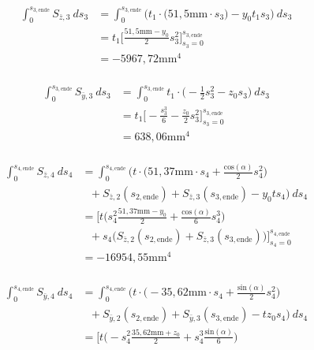 \begin{itemize}
\begin{equation}
\begin{split}
			\int_{0}^{s_{3,\mathrm{ende}}} S_{\bar z,3}\ ds_3 &= \int_{0}^{s_{3,\mathrm{ende}}} \bigg(t_1\cdot\bigg(51,5\mathrm{mm}\cdot s_3\bigg) -y_0t_1s_3\bigg)\ ds_3\\\
			&=t_1\bigg[\frac{51,5\mathrm{mm}-y_0}{2}s_3^2\bigg]_{s_3=0}^{s_{3,\mathrm{ende}}}\\\
			&=-5967,72\mathrm{mm}^4
		\end{split}
	\end{equation}\\
	\begin{equation}
		\begin{split}
			\int_{0}^{s_{3,\mathrm{ende}}} S_{\bar y,3}\ ds_3 &= \int_{0}^{s_{3,\mathrm{ende}}} t_1\cdot\bigg(-\frac{1}{2}s^2_3-z_0s_3\bigg)\ ds_3\\\
			&=t_1\bigg[-\frac{s_3^3}{6}-\frac{z_0}{2}s_3^2\bigg]_{s_3=0}^{s_{3,\mathrm{ende}}}\\\
			&=638,06\mathrm{mm}^4
		\end{split}
	\end{equation}\\
	\begin{equation}
		\begin{split}
			\int_{0}^{s_{4,\mathrm{ende}}} S_{\bar z,4}\ ds_4 &= \int_{0}^{s_{4,\mathrm{ende}}} \bigg(t\cdot\bigg(51,37\mathrm{mm}\cdot s_4+ \frac{\mathrm{cos}(\alpha)}{2}s^2_4\bigg)  \\\
			&\ \ \ + S_{\bar z,2}(s_{2,\mathrm{ende}})  + S_{\bar z,3}(s_{3,\mathrm{ende}})-y_0ts_4\bigg)\ ds_4\\\
			&= \bigg[t\bigg(s_4^2\frac{51,37\mathrm{mm}-y_0}{2}+\frac{\mathrm{cos}(\alpha)}{6}s_4^3\bigg) \\\
			&\ \ \ +s_4\bigg(S_{\bar z,2}(s_{2,\mathrm{ende}})  + S_{\bar z,3}(s_{3,\mathrm{ende}})\bigg)\bigg]_{s_4=0}^{s_{4,\mathrm{ende}}}\\\
			&=-16954,55\mathrm{mm}^4
		\end{split}
	\end{equation}\\
	\begin{equation}
		\begin{split}
			 \int_{0}^{s_{4,\mathrm{ende}}} S_{\bar y,4}\ ds_4 &= \int_{0}^{s_{4,\mathrm{ende}}} \bigg(t\cdot\bigg(-35,62\mathrm{mm}\cdot s_4 + \frac{\mathrm{sin}(\alpha)}{2}s^2_4\bigg)  \\\
			 &\ \ \ + S_{\bar y,2}(s_{2,\mathrm{ende}})  + S_{\bar y,3}(s_{3,\mathrm{ende}})-tz_0s_4\bigg)\ ds_4\\\
			 &=\bigg[t\bigg(-s_4^2\frac{35,62\mathrm{mm}+z_0}{2}+s_4^3\frac{\mathrm{sin}(\alpha)}{6}\bigg) \\\

\end{split}
\end{equation}
\end{itemize}
